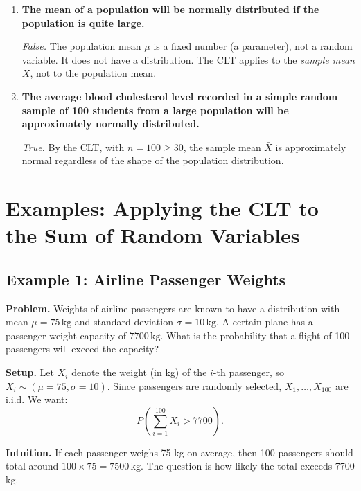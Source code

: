 \documentclass[10pt]{report}
\begin{document}
\begin{enumerate}
  \item \textbf{The mean of a population will be normally distributed if the population is quite large.}
  
  \textit{False.} The population mean $\mu$ is a fixed number (a parameter), not a random variable. It does not have a distribution. The CLT applies to the \textit{sample mean} $\bar{X}$, not to the population mean.
  
  \item \textbf{The average blood cholesterol level recorded in a simple random sample of 100 students from a large population will be approximately normally distributed.}
  
  \textit{True.} By the CLT, with $n = 100 \geq 30$, the sample mean $\bar{X}$ is approximately normal regardless of the shape of the population distribution.
\end{enumerate}

\bigskip


\section{Examples: Applying the CLT to the Sum of Random Variables}

\subsection{Example 1: Airline Passenger Weights}

\textbf{Problem.} Weights of airline passengers are known to have a distribution with mean $\mu = 75\,\text{kg}$ and standard deviation $\sigma = 10\,\text{kg}$. A certain plane has a passenger weight capacity of $7700\,\text{kg}$. What is the probability that a flight of 100 passengers will exceed the capacity?

\textbf{Setup.} Let $X_i$ denote the weight (in kg) of the $i$-th passenger, so $X_i \sim (\mu = 75, \sigma = 10)$. Since passengers are randomly selected, $X_1, \ldots, X_{100}$ are i.i.d. We want:
\[
P\!\left(\sum_{i=1}^{100} X_i > 7700\right).
\]

\textbf{Intuition.} If each passenger weighs 75 kg on average, then 100 passengers should total around $100 \times 75 = 7500\,\text{kg}$. The question is how likely the total exceeds 7700 kg.
\end{document}
